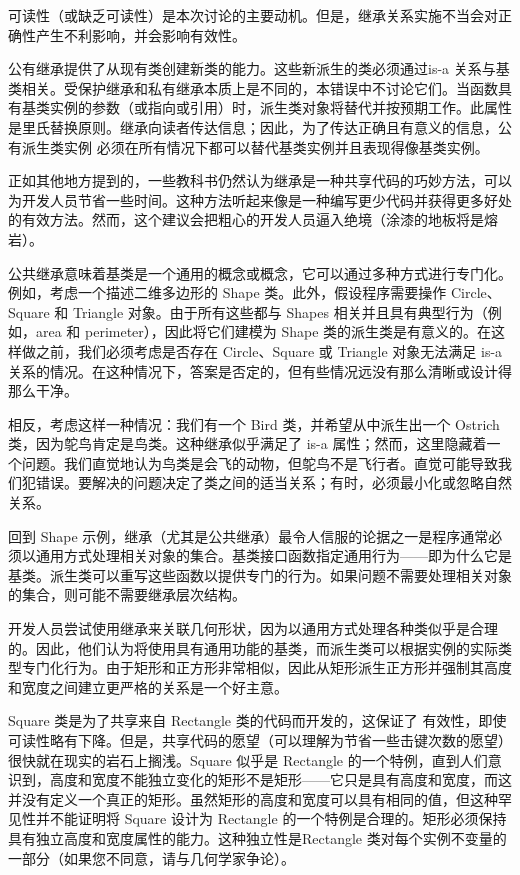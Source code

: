 可读性（或缺乏可读性）是本次讨论的主要动机。但是，继承关系实施不当会对正确性产生不利影响，并会影响有效性。

公有继承提供了从现有类创建新类的能力。这些新派生的类必须通过is-a 关系与基类相关。受保护继承和私有继承本质上是不同的，本错误中不讨论它们。当函数具有基类实例的参数（或指向或引用）时，派生类对象将替代并按预期工作。此属性是里氏替换原则。继承向读者传达信息；因此，为了传达正确且有意义的信息，公有派生类实例 必须在所有情况下都可以替代基类实例并且表现得像基类实例。


正如其他地方提到的，一些教科书仍然认为继承是一种共享代码的巧妙方法，可以为开发人员节省一些时间。这种方法听起来像是一种编写更少代码并获得更多好处的有效方法。然而，这个建议会把粗心的开发人员逼入绝境（涂漆的地板将是熔岩）。

公共继承意味着基类是一个通用的概念或概念，它可以通过多种方式进行专门化。例如，考虑一个描述二维多边形的 Shape 类。此外，假设程序需要操作 Circle、Square 和 Triangle 对象。由于所有这些都与 Shapes 相关并且具有典型行为（例如，area 和 perimeter），因此将它们建模为 Shape 类的派生类是有意义的。在这样做之前，我们必须考虑是否存在 Circle、Square 或 Triangle 对象无法满足 is-a 关系的情况。在这种情况下，答案是否定的，但有些情况远没有那么清晰或设计得那么干净。

相反，考虑这样一种情况：我们有一个 Bird 类，并希望从中派生出一个 Ostrich 类，因为鸵鸟肯定是鸟类。这种继承似乎满足了 is-a 属性；然而，这里隐藏着一个问题。我们直觉地认为鸟类是会飞的动物，但鸵鸟不是飞行者。直觉可能导致我们犯错误。要解决的问题决定了类之间的适当关系；有时，必须最小化或忽略自然关系。

回到 Shape 示例，继承（尤其是公共继承）最令人信服的论据之一是程序通常必须以通用方式处理相关对象的集合。基类接口函数指定通用行为——即为什么它是基类。派生类可以重写这些函数以提供专门的行为。如果问题不需要处理相关对象的集合，则可能不需要继承层次结构。


开发人员尝试使用继承来关联几何形状，因为以通用方式处理各种类似乎是合理的。因此，他们认为将使用具有通用功能的基类，而派生类可以根据实例的实际类型专门化行为。由于矩形和正方形非常相似，因此从矩形派生正方形并强制其高度和宽度之间建立更严格的关系是一个好主意。

Square 类是为了共享来自 Rectangle 类的代码而开发的，这保证了 有效性，即使可读性略有下降。但是，共享代码的愿望（可以理解为节省一些击键次数的愿望）很快就在现实的岩石上搁浅。Square 似乎是 Rectangle 的一个特例，直到人们意识到，高度和宽度不能独立变化的矩形不是矩形——它只是具有高度和宽度，而这并没有定义一个真正的矩形。虽然矩形的高度和宽度可以具有相同的值，但这种罕见性并不能证明将 Square 设计为 Rectangle 的一个特例是合理的。矩形必须保持具有独立高度和宽度属性的能力。这种独立性是Rectangle 类对每个实例不变量的一部分（如果您不同意，请与几何学家争论）。

